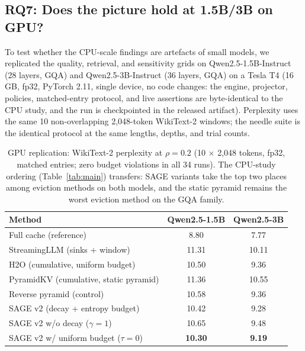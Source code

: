\subsection{RQ7: Does the picture hold at 1.5B/3B on GPU?}
\label{sec:exp-gpu}

To test whether the CPU-scale findings are artefacts of small models, we
replicated the quality, retrieval, and sensitivity grids on
Qwen2.5-1.5B-Instruct (28 layers, GQA) and Qwen2.5-3B-Instruct (36
layers, GQA) on a Tesla T4 (16\,GB, fp32, PyTorch 2.11, single device,
no code changes: the engine, projector, policies, matched-entry
protocol, and live assertions are byte-identical to the CPU study, and
the run is checkpointed in the released artifact). Perplexity uses the
same 10 non-overlapping 2{,}048-token WikiText-2 windows; the needle
suite is the identical protocol at the same lengths, depths, and trial
counts.

\begin{table}[t]
\centering\small
\caption{GPU replication: WikiText-2 perplexity at $\rho=0.2$ (10
$\times$ 2{,}048 tokens, fp32, matched entries; zero budget violations
in all 34 runs). The CPU-study ordering (Table~\ref{tab:main})
transfers: SAGE variants take the top two places among eviction methods
on both models, and the static pyramid remains the worst eviction method
on the GQA family.}
\label{tab:gpu}
\begin{tabular*}{\columnwidth}{@{\extracolsep{\fill}} l cc}
\toprule
Method & Qwen2.5-1.5B & Qwen2.5-3B \\
\midrule
Full cache (reference) & 8.80 & 7.77 \\
StreamingLLM (sinks + window) & 11.31 & 10.11 \\
H2O (cumulative, uniform budget) & 10.50 & 9.36 \\
PyramidKV (cumulative, static pyramid) & 11.36 & 10.55 \\
Reverse pyramid (control) & 10.58 & 9.36 \\
SAGE v2 (decay + entropy budget) & 10.42 & 9.28 \\
SAGE v2 w/o decay ($\gamma{=}1$) & 10.65 & 9.48 \\
SAGE v2 w/ uniform budget ($\tau{=}0$) & \textbf{10.30} & \textbf{9.19} \\
\bottomrule
\end{tabular*}
\end{table}

